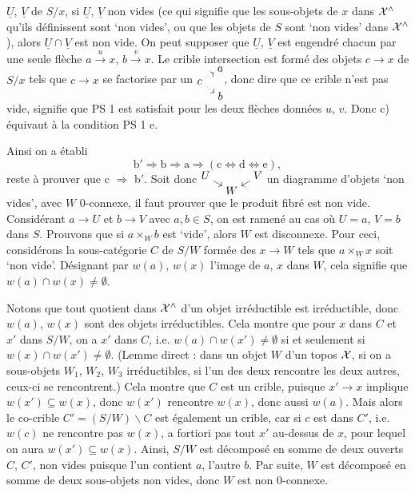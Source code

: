$\underline{U}$, $\underline{V}$ de $S/x$, si $\underline{U}$, $\underline{V}$ non vides (ce qui signifie que les sous-objets de $x$ dans $\mathcal{X}^\wedge$ qu'ils définissent sont `non vides', ou que les objets de $S$ sont `non vides' dans $\mathcal{X}^\wedge$), alors $\underline{U}\cap\underline{V}$ est non vide. On peut supposer que $\underline{U}$, $\underline{V}$ est engendré chacun par une seule flèche $a\xrightarrow{u}x$, $b\xrightarrow{v}x$. Le crible intersection est formé des objets $c\longrightarrow x$ de $S/x$ tels que $c\longrightarrow x$ se factorise par un $\begin{tikzcd}[cramped, row sep=0.1em, column sep=0.8em, baseline=(current bounding box.center)] & a \\ c \arrow[ur, dotted] \arrow[dr, dotted] & \\ & b \end{tikzcd}$, donc dire que ce crible n'est pas vide, signifie que PS 1 est satisfait pour les deux flèches données $u$, $v$. Donc c) équivaut à la condition PS 1 e.

Ainsi on a établi
\[
\mathrm{b}'\Longrightarrow\mathrm{b}\Longrightarrow\mathrm{a}\Longrightarrow(\mathrm{c}\Longleftrightarrow\mathrm{d}\Longleftrightarrow\mathrm{e}),
\]
reste à prouver que c $\Longrightarrow$ b$'$. Soit donc $\begin{tikzcd}[cramped, row sep=0.1em, column sep=0.8em, baseline=(current bounding box.center)] U \arrow[dr] & & V \arrow[dl] \\ & W & \end{tikzcd}$ un diagramme d'objets `non vides', avec $W$ 0-connexe, il faut prouver que le produit fibré est non vide. Considérant $a\longrightarrow U$ et $b\longrightarrow V$ avec $a,b\in S$, on est ramené au cas où $U=a$, $V=b$ dans $S$. Prouvons que si $a\times_W b$ est `vide', alors $W$ est disconnexe. Pour ceci, considérons la sous-catégorie $C$ de $S/W$ formée des $x\longrightarrow W$ tels que $a\times_W x$ soit `non vide'. Désignant par $w(a)$, $w(x)$ l'image de $a$, $x$ dans $W$, cela signifie que $w(a)\cap w(x)\neq\emptyset$.

Notons que tout quotient dans $\mathcal{X}^\wedge$ d'un objet irréductible est irréductible, donc $w(a)$, $w(x)$ sont des objets irréductibles. Cela montre que pour $x$ dans $C$ et $x'$ dans $S/W$, on a $x'$ dans $C$, i.e. $w(a)\cap w(x')\neq\emptyset$ si et seulement si $w(x)\cap w(x')\neq\emptyset$. (Lemme direct : dans un objet $W$ d'un topos $\mathcal{X}$, si on a sous-objets $W_1$, $W_2$, $W_3$ irréductibles, si l'un des deux rencontre les deux autres, ceux-ci se rencontrent.) Cela montre que $C$ est un crible, puisque $x'\longrightarrow x$ implique $w(x')\subseteq w(x)$, donc $w(x')$ rencontre $w(x)$, donc aussi $w(a)$. Mais alors le co-crible $C'=(S/W)\backslash C$ est également un crible, car si $c$
est dans $C'$, i.e. $w(c)$ ne rencontre pas $w(x)$, a fortiori pas tout $x'$ au-dessus de $x$, pour lequel on aura $w(x')\subseteq w(x)$. Ainsi, $S/W$ est décomposé en somme de deux ouverts $C$, $C'$, non vides puisque l'un contient $a$, l'autre $b$. Par suite, $W$ est décomposé en somme de deux sous-objets non vides, donc $W$ est non 0-connexe.

